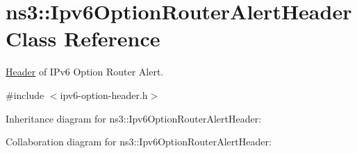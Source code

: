 \hypertarget{classns3_1_1Ipv6OptionRouterAlertHeader}{}\section{ns3\+:\+:Ipv6\+Option\+Router\+Alert\+Header Class Reference}
\label{classns3_1_1Ipv6OptionRouterAlertHeader}


\hyperlink{classns3_1_1Header}{Header} of I\+Pv6 Option Router Alert.  




{\ttfamily \#include $<$ipv6-\/option-\/header.\+h$>$}



Inheritance diagram for ns3\+:\+:Ipv6\+Option\+Router\+Alert\+Header\+:


Collaboration diagram for ns3\+:\+:Ipv6\+Option\+Router\+Alert\+Header\+:
